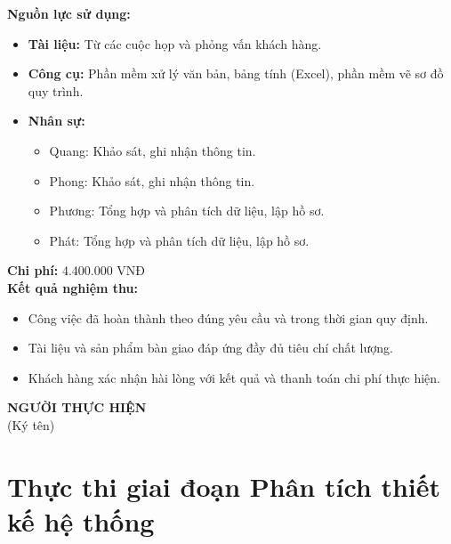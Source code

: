 {\begin{minipage}{\textwidth}
        \noindent\textbf{Nguồn lực sử dụng:}
        \begin{itemize}
            \item \textbf{Tài liệu:} Từ các cuộc họp và phỏng vấn khách hàng.
            \item \textbf{Công cụ:} Phần mềm xử lý văn bản, bảng tính (Excel), phần mềm vẽ sơ đồ quy trình.
            \item \textbf{Nhân sự:}
                  \begin{itemize}
                      \item Quang: Khảo sát, ghi nhận thông tin.
                      \item Phong: Khảo sát, ghi nhận thông tin.
                      \item Phương: Tổng hợp và phân tích dữ liệu, lập hồ sơ.
                      \item Phát: Tổng hợp và phân tích dữ liệu, lập hồ sơ.
                  \end{itemize}
        \end{itemize}
        \noindent\textbf{Chi phí:} 4.400.000 VNĐ\\
        \noindent\textbf{Kết quả nghiệm thu:}
        \begin{itemize}
            \item Công việc đã hoàn thành theo đúng yêu cầu và trong thời gian quy định.
            \item Tài liệu và sản phẩm bàn giao đáp ứng đầy đủ tiêu chí chất lượng.
            \item Khách hàng xác nhận hài lòng với kết quả và thanh toán chi phí thực hiện.
        \end{itemize}
        \begin{flushleft}
            \hspace{8cm} \textbf{NGƯỜI THỰC HIỆN} \\
            \hspace{9.5cm} (Ký tên) \\ \vspace{1cm}
        \end{flushleft}
    \end{minipage}
}

\clearpage
\section{Thực thi giai đoạn Phân tích thiết kế hệ thống}

